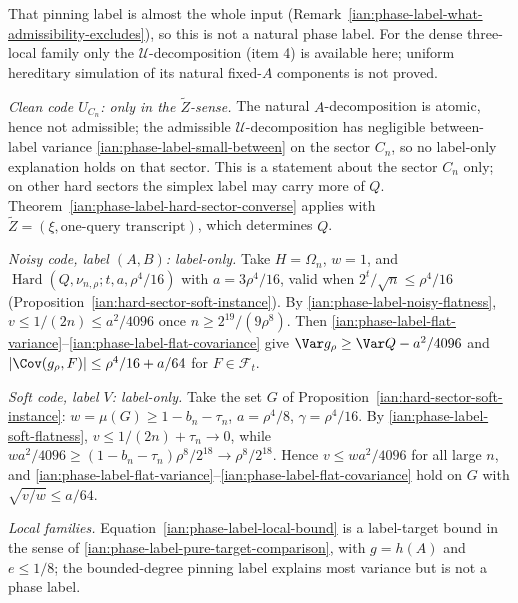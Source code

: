 That pinning label is almost the whole input
(Remark~\ref{ian:phase-label-what-admissibility-excludes}), so this is
not a natural phase label. For the dense three-local family only the
\(\mathcal U\)-decomposition (item 4) is available here; uniform
hereditary simulation of its natural fixed-\(A\) components is not
proved.

\begin{remark}
\label{ian:phase-label-instance-senses}
\emph{Clean code \(U_{C_n}\): only in the \(\widetilde Z\)-sense.} The
natural \(A\)-decomposition is atomic, hence not admissible; the
admissible \(\mathcal U\)-decomposition has negligible between-label
variance \eqref{ian:phase-label-small-between} on the sector \(C_n\), so
no label-only explanation holds on that sector. This is a statement
about the sector \(C_n\) only; on other hard sectors the simplex label
may carry more of \(Q\). Theorem~\ref{ian:phase-label-hard-sector-converse} applies
with \(\widetilde Z=(\xi,\text{one-query transcript})\), which determines
\(Q\).

\emph{Noisy code, label \((A,B)\): label-only.} Take \(H=\Omega_n\),
\(w=1\), and \(\operatorname{Hard}(Q,\nu_{n,\rho};t,a,\rho^4/16)\) with
\(a=3\rho^4/16\), valid when \(2^t/\sqrt n\le\rho^4/16\)
(Proposition~\ref{ian:hard-sector-soft-instance}). By
\eqref{ian:phase-label-noisy-flatness}, \(v\le1/(2n)\le a^2/4096\) once
\(n\ge2^{19}/(9\rho^8)\). Then
\eqref{ian:phase-label-flat-variance}--\eqref{ian:phase-label-flat-covariance}
give \(\Var g_\rho\ge\Var Q-a^2/4096\) and
\(|\Cov(g_\rho,F)|\le\rho^4/16+a/64\) for \(F\in\mathcal F_t\).

\emph{Soft code, label \(V\): label-only.} Take the set \(G\) of
Proposition~\ref{ian:hard-sector-soft-instance}: \(w=\mu(G)\ge1-b_n-\tau_n\),
\(a=\rho^4/8\), \(\gamma=\rho^4/16\). By
\eqref{ian:phase-label-soft-flatness}, \(v\le1/(2n)+\tau_n\to0\), while
\(wa^2/4096\ge(1-b_n-\tau_n)\rho^8/2^{18}\to\rho^8/2^{18}\). Hence
\(v\le wa^2/4096\) for all large \(n\), and
\eqref{ian:phase-label-flat-variance}--\eqref{ian:phase-label-flat-covariance}
hold on \(G\) with \(\sqrt{v/w}\le a/64\).

\emph{Local families.} Equation~\eqref{ian:phase-label-local-bound} is a
label-target bound in the sense of
\eqref{ian:phase-label-pure-target-comparison}, with \(g=h(A)\) and
\(e\le1/8\); the bounded-degree pinning label explains most variance but
is not a phase label.
\end{remark}

